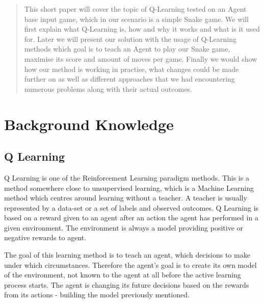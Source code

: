 \documentclass[]{article}
\title{}
\author{Karolina Drabent \\ Patryk Fijałkowski \\ Artur Haczek \\ Krzysztof Kamiński \\ Pamela Krzypkowska}
\begin{document}
\maketitle

\begin{abstract}
	
\par This short paper will cover the topic of Q-Learning tested on an Agent base input game, which in our scenario is a simple Snake game. We will first explain what Q-Learning is, how and why it works and what is it used for. Later we will present our solution with the usage of Q-Learning methods which goal is to teach an Agent to play our Snake game, maximise its score and amount of moves per game. Finally we would show how our method is working in practise, what changes could be made further on as well as different approaches that we had encountering numerous problems along with their actual outcomes.

\end{abstract}

\section{Background Knowledge}

\subsection{Q Learning}

\par Q Learning is one of the Reinforcement Learning paradigm methods. This is a method somewhere close to unsupervised learning, which is a Machine Learning method which centres around learning without a teacher. A teacher is usually represented by a data-set or a set of labels and observed outcomes. Q Learning is based on a reward given to an agent after an action the agent has performed in a given environment. The environment is always a model providing positive or negative rewards to agent. 

\par The goal of this learning method is to teach an agent, which decisions to make under which circumstances. Therefore the agent's goal is to create its own model of the environment, not known to the agent at all before the active learning process starts. The agent is changing its future decisions based on the rewards from its actions - building the model previously mentioned. 
\end{document}
